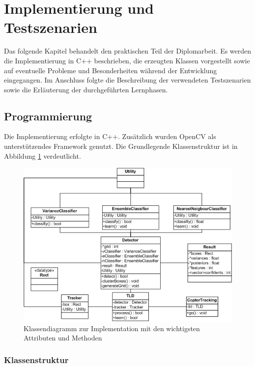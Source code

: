 \section{Implementierung und Testszenarien}
Das folgende Kapitel behandelt den praktischen Teil der Diplomarbeit. Es werden die Implementierung in C++ beschrieben, die erzeugten Klassen vorgestellt sowie auf eventuelle Probleme und Besonderheiten während der Entwicklung eingegangen. Im Anschluss folgte die Beschreibung der verwendeten Testszenarien sowie die Erläuterung der durchgeführten Lernphasen.

\subsection{Programmierung}
Die Implementierung erfolgte in C++. Zusätzlich wurden OpenCV als unterstützendes Framework genutzt. Die Grundlegende Klassenstruktur ist in Abbildung \ref{klassendiagramm} verdeutlicht.

\begin{figure}
\begin{centering}
\includegraphics{../pictures/Klassendiagrammvsd.jpg}
\caption{Klassendiagramm zur Implementation mit den wichtigsten Attributen und Methoden}
\label{klassendiagramm}
\par\end{centering}
\end{figure}

\subsubsection{Klassenstruktur}
